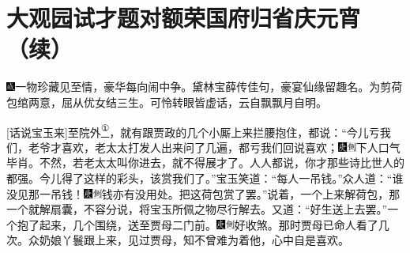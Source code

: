 

\chapter{大观园试才题对额\hspace{.5em}荣国府归省庆元宵（续）}
{\includegraphics[width=3mm]{../Images/00005}一物珍藏见至情，豪华每向闹中争。黛林宝薛传佳句，豪宴仙缘留趣名。为剪荷包绾两意，屈从优女结三生。可怜转眼皆虚话，云自飘飘月自明。}

{[}话说宝玉来{]}至院外\href{../Text/part0022_split_000.html\#lnkback_1_a}{\textsuperscript{①}}，就有跟贾政的几个小厮上来拦腰抱住，都说：``今儿亏我们，老爷才喜欢，老太太打发人出来问了几遍，都亏我们回说喜欢；{\includegraphics[width=3mm]{../Images/00004}\includegraphics[width=3mm]{../Images/00011}\footnotesize \kaishu 下人口气毕肖。}不然，若老太太叫你进去，就不得展才了。人人都说，你才那些诗比世人的都强。今儿得了这样的彩头，该赏我们了。''宝玉笑道：``每人一吊钱。''众人道：``谁没见那一吊钱！{\includegraphics[width=3mm]{../Images/00004}\includegraphics[width=3mm]{../Images/00011}\footnotesize \kaishu 钱亦有没用处。}把这荷包赏了罢。''说着，一个上来解荷包，那一个就解扇囊，不容分说，将宝玉所佩之物尽行解去。又道：``好生送上去罢。''一个抱了起来，几个围绕，送至贾母二门前。{\includegraphics[width=3mm]{../Images/00004}\includegraphics[width=3mm]{../Images/00011}\footnotesize \kaishu 好收煞。}那时贾母已命人看了几次。众奶娘丫鬟跟上来，见过贾母，知不曾难为着他，心中自是喜欢。

